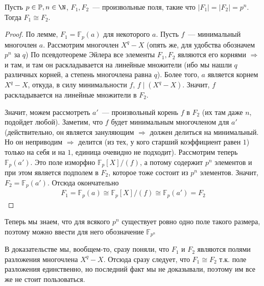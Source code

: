 \begin{theorem}
    Пусть $p\in \mathbb{P}, n\in \N$, $F_1, F_2$~--- произвольные поля, такие что $|F_1|=|F_2|=p^n$.
    Тогда $F_1\cong F_2$.
\end{theorem}
\begin{proof}
    По лемме, $F_1=\mathbb{F}_p(a)$ для некоторого $a$.
    Пусть $f$~--- минимальный многочлен $a$.
    Рассмотрим многочлен $X^q-X$ (опять же, для удобства обозначем $p^n$ за $q$)
    По псевдотеореме Эйлера все элементы $F_1, F_2$ являются его корнями $\Rightarrow$ и там, и там он раскладывается на линейные множители (ибо мы нашли $q$ различных корней, а степень многочлена равна $q$).
    Более того, $a$ является корнем $X^q-X$, откуда, в силу минимальности $f$, $f \mid (X^q-X)$.
    Значит, $f$ раскладывается на линейные множители в $F_2$.

    Значит, можем рассмотреть $a'$~--- произвольный корень $f$ в $F_2$ (их там даже $n$, подойдет любой).
    Заметим, что $f$ будет минимальным многочленом для $a'$ (действительно, он является зануляющим $\Rightarrow$ должен делиться на минимальный. Но он неприводим $\Rightarrow$ делится (из тех, у кого старший коэффициент равен $1$) только на себя и на $1$, единица очевидно не подходит).
    Рассмотрим теперь $\mathbb{F}_p(a')$.
    Это поле изморфно $\mathbb{F}_p[X] / (f)$, а потому содержит $p^n$ элементов и при этом является подполем в $F_2$, которое тоже состоит из $p^n$ элементов.
    Значит, $F_2 = \mathbb{F}_p(a')$.
    Отсюда окончательно
    \begin{gather*}
        F_1 = \mathbb{F}_p(a) \cong \mathbb{F}_p[X] / (f) \cong \mathbb{F}_p(a') = F_2
    \end{gather*}
\end{proof}

\notice Теперь мы знаем, что для всякого $p^n$ существует ровно одно поле такого размера, поэтому можно ввести для него обозначение $\mathbb{F}_{p^n}$

\notice В доказательстве мы, вообщем-то, сразу поняли, что $F_1$ и $F_2$ являются полями разложения многочлена $X^q-X$.
Отсюда сразу следует, что $F_1\cong F_2$ т.к. поле разложения единственно, но последний факт мы не доказывали, поэтому им все же не стоит пользоваться.

